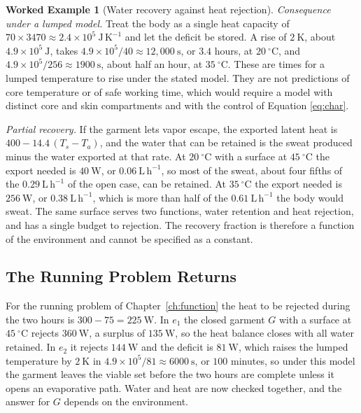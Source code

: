 \documentclass[11pt,openany]{book}
\theoremstyle{definition}
\newtheorem{example}{Worked Example}[chapter]
\theoremstyle{remark}
\begin{document}
\begin{example}[Water recovery against heat rejection]
\emph{Consequence under a lumped model.} Treat the body as a single heat capacity of $70\times3470\approx2.4\times10^{5}\ \mathrm{J\,K^{-1}}$ and let the deficit be stored. A rise of $2\ \mathrm{K}$, about $4.9\times10^{5}\ \mathrm{J}$, takes $4.9\times10^{5}/40\approx12{,}000\ \mathrm{s}$, or $3.4$ hours, at $20\ ^\circ\mathrm{C}$, and $4.9\times10^{5}/256\approx1900\ \mathrm{s}$, about half an hour, at $35\ ^\circ\mathrm{C}$. These are times for a lumped temperature to rise under the stated model. They are not predictions of core temperature or of safe working time, which would require a model with distinct core and skin compartments and with the control of Equation \eqref{eq:char}.

\emph{Partial recovery.} If the garment lets vapor escape, the exported latent heat is $400-14.4\,(T_s-T_a)$, and the water that can be retained is the sweat produced minus the water exported at that rate. At $20\ ^\circ\mathrm{C}$ with a surface at $45\ ^\circ\mathrm{C}$ the export needed is $40\ \mathrm{W}$, or $0.06\ \mathrm{L\,h^{-1}}$, so most of the sweat, about four fifths of the $0.29\ \mathrm{L\,h^{-1}}$ of the open case, can be retained. At $35\ ^\circ\mathrm{C}$ the export needed is $256\ \mathrm{W}$, or $0.38\ \mathrm{L\,h^{-1}}$, which is more than half of the $0.61\ \mathrm{L\,h^{-1}}$ the body would sweat. The same surface serves two functions, water retention and heat rejection, and has a single budget to rejection. The recovery fraction is therefore a function of the environment and cannot be specified as a constant.
\end{example}

\subsection*{The Running Problem Returns}

For the running problem of Chapter~\ref{ch:function} the heat to be rejected during the two hours is $300-75=225\ \mathrm{W}$. In $e_1$ the closed garment $G$ with a surface at $45\ ^\circ\mathrm{C}$ rejects $360\ \mathrm{W}$, a surplus of $135\ \mathrm{W}$, so the heat balance closes with all water retained. In $e_2$ it rejects $144\ \mathrm{W}$ and the deficit is $81\ \mathrm{W}$, which raises the lumped temperature by $2\ \mathrm{K}$ in $4.9\times10^{5}/81\approx6000\ \mathrm{s}$, or $100$ minutes, so under this model the garment leaves the viable set before the two hours are complete unless it opens an evaporative path. Water and heat are now checked together, and the answer for $G$ depends on the environment.
\end{document}
